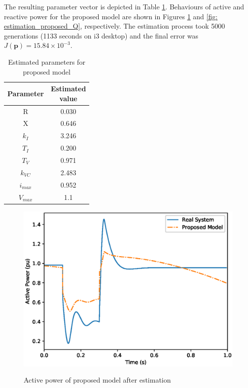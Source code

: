 The resulting parameter vector is depicted in Table \ref{tab: results_proposed}. Behaviours of active and reactive power for the proposed model are shown in Figures \ref{fig: estimation_proposed_P} and \ref{fig: estimation_proposed_Q}, respectively. The estimation process took 5000 generations (1133 seconds on i3 desktop) and the final error was $J(\mathbf{p}) = 15.84\times 10^{-3}$.

\begin{table}[h]
	\centering
	\caption{Estimated parameters for proposed model}
	\begin{tabular}{c|c}
		Parameter & \shortstack{Estimated \\ value} \\\hline
		R & 0.030 \\
		X & 0.646 \\
		$k_{I}$ & 3.246 \\
		$T_{I}$ & 0.200 \\
		$T_{V}$ & 0.971 \\
		$k_{VC}$ & 2.483 \\
		$i_{max}$ & 0.952 \\
		$V_{max}$ & 1.1
	\end{tabular}
	\label{tab: results_proposed}
\end{table}

\begin{figure}[!h]
	\centering
	\caption{Active power of proposed model after estimation}
	\includegraphics[scale=.7]{Images/P_proposed_estimated.eps}
	\label{fig: estimation_proposed_P}
\end{figure}

